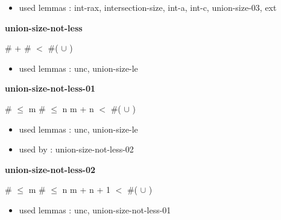 \documentclass[a4paper]{article}
\begin{document}
\begin{itemize}


\item       used lemmas  : int-rax, intersection-size, int-a, int-c, union-size-03, ext

\end{itemize}

\medskip

\bigskip

{\large\bf union-size-not-less}

\medskip

 \Fol \Not \#  + \#  $<$ \#( $\cup$ )

\begin{itemize}


\item       used lemmas  : unc, union-size-le

\end{itemize}

\medskip

\bigskip

{\large\bf union-size-not-less-01}

\medskip

 \Fol \#  $\le$ m \And \#  $\le$ n \Imp \Not m + n $<$ \#( $\cup$ )

\begin{itemize}


\item       used lemmas  : unc, union-size-le
\item       used by      : union-size-not-less-02

\end{itemize}

\medskip

\bigskip

{\large\bf union-size-not-less-02}

\medskip

 \Fol \#  $\le$ m \And \#  $\le$ n \Imp \Not m + n + 1 $<$ \#( $\cup$ )

\begin{itemize}


\item       used lemmas  : unc, union-size-not-less-01

\end{itemize}

\medskip

\bigskip
\end{document}
